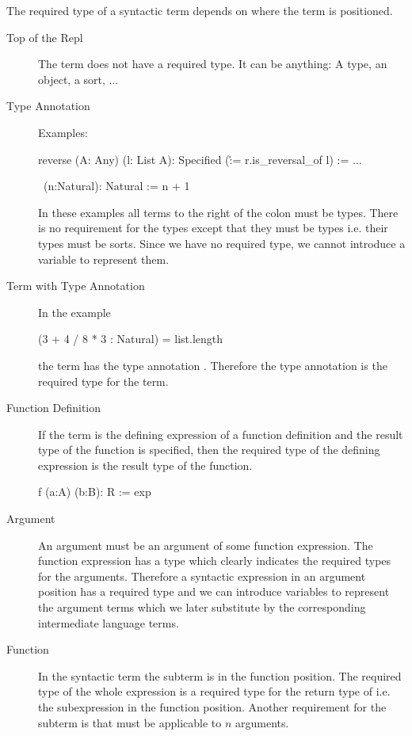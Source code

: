 The required type of a syntactic term depends on where the term is positioned.
%
\begin{description}

\item[Top of the Repl]
  The term does not have a required type. It can be anything: A type, an
  object, a sort, ...

\item[Type Annotation]
  Examples:
  \begin{alba}
     reverse (A: Any) (l: List A): Specified (\r := r.is_reversal_of l)
       := ...

     \ (n:Natural): Natural := n + 1
  \end{alba}
   In these examples all terms to the right of the colon \code{:} must be
   types. There is no requirement for the types except that they must be types
   i.e. their types must be sorts. Since we have no required type, we cannot
   introduce a variable to represent them.

 \item[Term with Type Annotation]
   In the example
   \begin{alba}
     (3 + 4 / 8 * 3 : Natural) = list.length
   \end{alba}
   the term  has the type annotation
   . Therefore the type annotation  is the
   required type for the term.

 \item[Function Definition]
   If the term is the defining expression of a function definition and the
   result type of the function is specified, then the required type of the
   defining expression is the result type of the function.
   \begin{alba}
     f (a:A) (b:B): R := exp
   \end{alba}

 \item[Argument]
   An argument must be an argument of some function expression. The function
   expression has a type which clearly indicates the required types for the
   arguments. Therefore a syntactic expression in an argument position has a
   required type and we can introduce variables to represent the argument
   terms which we later substitute by the corresponding intermediate language
   terms.

 \item[Function]
   In the syntactic term  the subterm  is in the function
   position. The required type of the whole expression is a required type for
   the return type of  i.e. the subexpression in the function
   position. Another requirement for the subterm  is that must be
   applicable to $n$ arguments.
\end{description}



